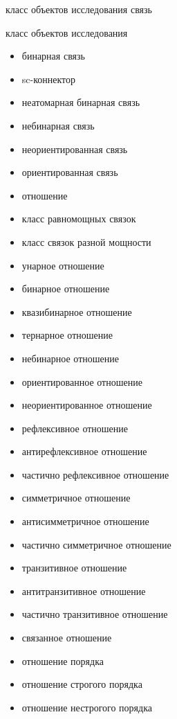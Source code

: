 \begin{SCn}
\scnsectionheader{\currentname}
\begin{scnsubstruct}
\begin{scnhaselementrole}{класс объектов исследования}
связь\end{scnhaselementrole}
\begin{scnhaselementrolelist}{класс объектов исследования}
\begin{itemize}
  \item бинарная связь
  \item sc-коннектор
  \item неатомарная бинарная связь
  \item небинарная связь
  \item неориентированная связь
  \item ориентированная связь
  \item отношение
  \item класс равномощных связок
  \item класс связок разной мощности
  \item унарное отношение
  \item бинарное отношение
  \item квазибинарное отношение
  \item тернарное отношение
  \item небинарное отношение
  \item ориентированное отношение
  \item неориентированное отношение
  \item рефлексивное отношение
  \item антирефлексивное отношение
  \item частично рефлексивное отношение
  \item симметричное отношение
  \item антисимметричное отношение
  \item частично симметричное отношение
  \item транзитивное отношение
  \item антитранзитивное отношение
  \item частично транзитивное отношение
  \item связанное отношение
  \item отношение порядка
  \item отношение строгого порядка
  \item отношение нестрогого порядка

\end{itemize}
\end{scnhaselementrolelist}
\end{scnsubstruct}
\end{SCn}
